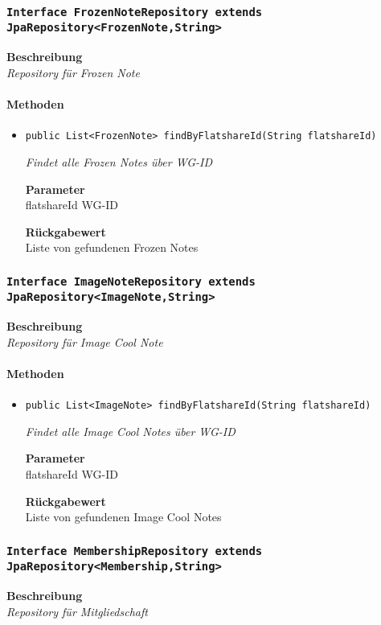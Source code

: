      \subsubsection{\texttt{Interface FrozenNoteRepository extends JpaRepository<FrozenNote,String>}}
     \textbf{Beschreibung} \\
     \textit{Repository für Frozen Note}
     \paragraph*{Methoden}
     \begin{itemize}
     	\item{\texttt{public List<FrozenNote> findByFlatshareId(String flatshareId)}}
     	
     	\textit{Findet alle Frozen Notes über WG-ID}
     	
     	\textbf{Parameter} \\
     	flatshareId WG-ID
     	
     	\textbf{Rückgabewert} \\
     	Liste von gefundenen Frozen Notes
     \end{itemize}
     \subsubsection{\texttt{Interface ImageNoteRepository extends JpaRepository<ImageNote,String>}}
     \textbf{Beschreibung} \\
     \textit{Repository für Image Cool Note}
     \paragraph*{Methoden}
     \begin{itemize}
     	\item{\texttt{public List<ImageNote> findByFlatshareId(String flatshareId)}}
     	
     	\textit{Findet alle Image Cool Notes über WG-ID}
     	
     	\textbf{Parameter} \\
     	flatshareId WG-ID
     	
     	\textbf{Rückgabewert} \\
     	Liste von gefundenen Image Cool Notes
     \end{itemize}
     \subsubsection{\texttt{Interface MembershipRepository extends JpaRepository<Membership,String>}}
     \textbf{Beschreibung} \\
     \textit{Repository für Mitgliedschaft}

